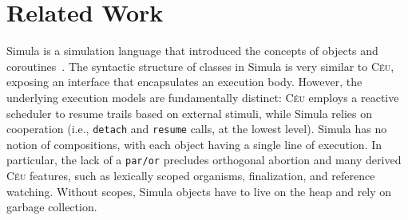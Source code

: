 \documentclass{sigplanconf}
\newcommand{\CEU}{\textsc{C\'{e}u}\xspace}
\newcommand{\code}[1] {{\small{\texttt{#1}}}}
\newcommand{\1}{\;}
\newcommand{\2}{\;\;}
\newcommand{\3}{\;\;\;}
\newcommand{\5}{\;\;\;\;\;}
\begin{document}
\section{Related Work}
\label{sec.related}

Simula is a simulation language that introduced the concepts of objects and 
coroutines~\cite{simula}.
%
The syntactic structure of classes in Simula is very similar to \CEU, exposing 
an interface that encapsulates an execution body.
%
However, the underlying execution models are fundamentally distinct:
\CEU employs a reactive scheduler to resume trails based on external stimuli, 
while Simula relies on cooperation (i.e., \code{detach} and \code{resume} 
calls, at the lowest level).
%
Simula has no notion of compositions, with each object having a single line of 
execution.
In particular, the lack of a \code{par/or} precludes orthogonal abortion and 
many derived \CEU features, such as lexically scoped organisms, finalization, 
and reference watching.
%
Without scopes, Simula objects have to live on the heap and rely on garbage 
collection.
%
\end{document}
